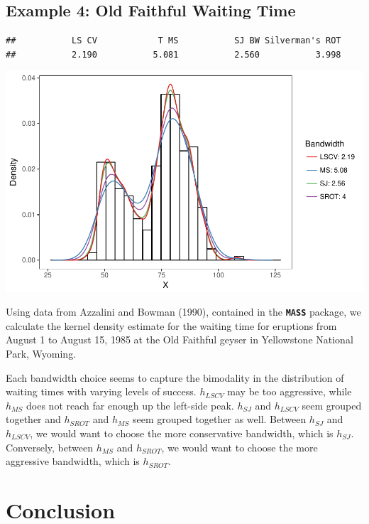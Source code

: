 \documentclass[]{article}
\begin{document}
\newpage

\subsection{Example 4: Old Faithful Waiting Time}

\begin{verbatim}
##           LS CV            T MS           SJ BW Silverman's ROT 
##           2.190           5.081           2.560           3.998
\end{verbatim}

\begin{center}\includegraphics{FinalReport_files/figure-latex/unnamed-chunk-9-1} \end{center}

Using data from Azzalini and Bowman (1990), contained in the
\textbf{\texttt{MASS}} package, we calculate the kernel density estimate
for the waiting time for eruptions from August 1 to August 15, 1985 at
the Old Faithful geyser in Yellowstone National Park, Wyoming.

Each bandwidth choice seems to capture the bimodality in the
distribution of waiting times with varying levels of success.
\(h_{LSCV}\) may be too aggressive, while \(h_{MS}\) does not reach far
enough up the left-side peak. \(h_{SJ}\) and \(h_{LSCV}\) seem grouped
together and \(h_{SROT}\) and \(h_{MS}\) seem grouped together as well.
Between \(h_{SJ}\) and \(h_{LSCV}\), we would want to choose the more
conservative bandwidth, which is \(h_{SJ}\). Conversely, between
\(h_{MS}\) and \(h_{SROT}\), we would want to choose the more aggressive
bandwidth, which is \(h_{SROT}\).

\section{Conclusion}\label{conclusion}
\end{document}
